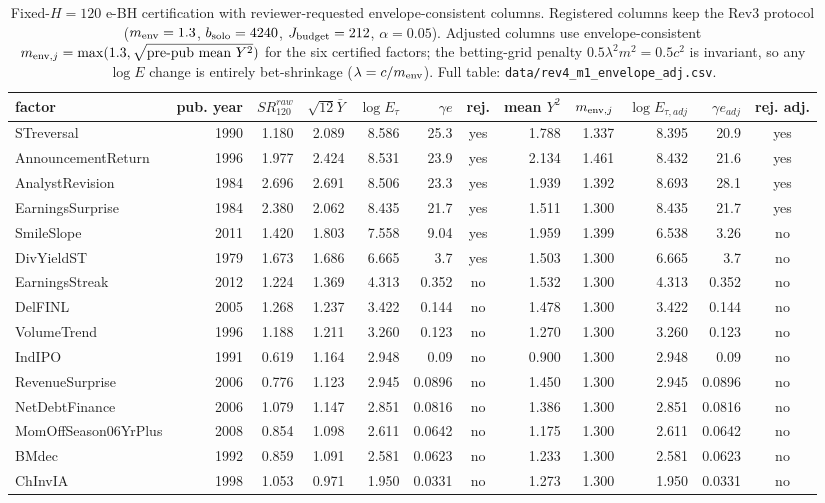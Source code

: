 \begin{table}[htbp]
\centering\scriptsize
\caption{Fixed-$H=120$ e-BH certification with reviewer-requested envelope-consistent columns. Registered columns keep the Rev3 protocol ($m_{\rm env}=1.3$, $b_{\rm solo}=4240$, $J_{\rm budget}=212$, $\alpha=0.05$). Adjusted columns use envelope-consistent $m_{{\rm env},j}=\max(1.3,\sqrt{\text{pre-pub mean }Y^2})$ for the six certified factors; the betting-grid penalty $0.5\lambda^2m^2=0.5c^2$ is invariant, so any $\log E$ change is entirely bet-shrinkage ($\lambda=c/m_{\rm env}$). Full table: \texttt{data/rev4\_m1\_envelope\_adj.csv}.}
\label{tab:rev3-m1-ebh-cert}
\begin{tabular}{lrrrrrcrrrrc}
\toprule
factor & pub. year & $SR^{raw}_{120}$ & $\sqrt{12}\bar{Y}$ & $\log E_\tau$ & $\gamma e$ & rej. & mean $Y^2$ & $m_{{\rm env},j}$ & $\log E_{\tau,adj}$ & $\gamma e_{adj}$ & rej. adj. \\
\midrule
STreversal & 1990 & 1.180 & 2.089 & 8.586 & 25.3 & yes & 1.788 & 1.337 & 8.395 & 20.9 & yes \\
AnnouncementReturn & 1996 & 1.977 & 2.424 & 8.531 & 23.9 & yes & 2.134 & 1.461 & 8.432 & 21.6 & yes \\
AnalystRevision & 1984 & 2.696 & 2.691 & 8.506 & 23.3 & yes & 1.939 & 1.392 & 8.693 & 28.1 & yes \\
EarningsSurprise & 1984 & 2.380 & 2.062 & 8.435 & 21.7 & yes & 1.511 & 1.300 & 8.435 & 21.7 & yes \\
SmileSlope & 2011 & 1.420 & 1.803 & 7.558 & 9.04 & yes & 1.959 & 1.399 & 6.538 & 3.26 & no \\
DivYieldST & 1979 & 1.673 & 1.686 & 6.665 & 3.7 & yes & 1.503 & 1.300 & 6.665 & 3.7 & no \\
EarningsStreak & 2012 & 1.224 & 1.369 & 4.313 & 0.352 & no & 1.532 & 1.300 & 4.313 & 0.352 & no \\
DelFINL & 2005 & 1.268 & 1.237 & 3.422 & 0.144 & no & 1.478 & 1.300 & 3.422 & 0.144 & no \\
VolumeTrend & 1996 & 1.188 & 1.211 & 3.260 & 0.123 & no & 1.270 & 1.300 & 3.260 & 0.123 & no \\
IndIPO & 1991 & 0.619 & 1.164 & 2.948 & 0.09 & no & 0.900 & 1.300 & 2.948 & 0.09 & no \\
RevenueSurprise & 2006 & 0.776 & 1.123 & 2.945 & 0.0896 & no & 1.450 & 1.300 & 2.945 & 0.0896 & no \\
NetDebtFinance & 2006 & 1.079 & 1.147 & 2.851 & 0.0816 & no & 1.386 & 1.300 & 2.851 & 0.0816 & no \\
MomOffSeason06YrPlus & 2008 & 0.854 & 1.098 & 2.611 & 0.0642 & no & 1.175 & 1.300 & 2.611 & 0.0642 & no \\
BMdec & 1992 & 0.859 & 1.091 & 2.581 & 0.0623 & no & 1.233 & 1.300 & 2.581 & 0.0623 & no \\
ChInvIA & 1998 & 1.053 & 0.971 & 1.950 & 0.0331 & no & 1.273 & 1.300 & 1.950 & 0.0331 & no \\
\bottomrule
\end{tabular}
\end{table}
